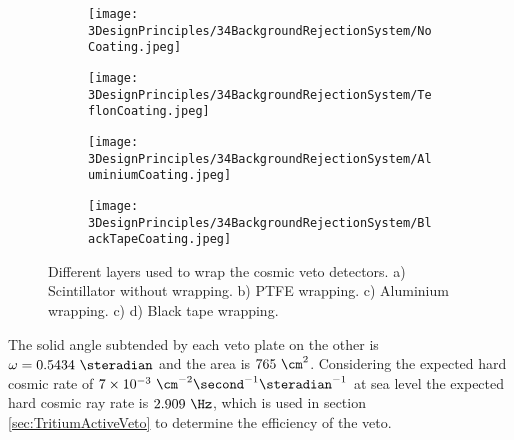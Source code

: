 \begin{figure}[h]
\centering
    \begin{subfigure}[b]{0.25\textwidth}
    \centering
    \texttt{[image: 3DesignPrinciples/34BackgroundRejectionSystem/NoCoating.jpeg]}  
    \caption{\label{subfig:PlasticScintillatorNoCoating}}
    \end{subfigure}
    \hfill
    \begin{subfigure}[b]{0.25\textwidth}
    \centering
    \texttt{[image: 3DesignPrinciples/34BackgroundRejectionSystem/TeflonCoating.jpeg]}  
    \caption{\label{subfig:PlasticScintillatorTeflon}}
    \end{subfigure}
    \newline
    \hfill
    \begin{subfigure}[b]{0.25\textwidth}
    \centering
    \texttt{[image: 3DesignPrinciples/34BackgroundRejectionSystem/AluminiumCoating.jpeg]}  
    \caption{\label{subfig:PlasticScintillatorAluminium}}
    \end{subfigure}
    \hfill
    \begin{subfigure}[b]{0.25\textwidth}
    \centering
    \texttt{[image: 3DesignPrinciples/34BackgroundRejectionSystem/BlackTapeCoating.jpeg]}  
    \caption{\label{subfig:PlasticScintillatorBlackTape}}
    \end{subfigure}
 \caption{Different layers used to wrap the cosmic veto detectors. a) Scintillator without wrapping. b) PTFE wrapping. c) Aluminium wrapping. c) d) Black tape wrapping.}
 \label{fig:LayersVeto}
\end{figure}

The solid angle subtended by each veto plate on the other is $\omega=0.5434~\steradian$ and the area is $765~\cm^2$. Considering the expected hard cosmic rate of $7 \times 10^{-3}~\cm^{-2}\second^{-1}\steradian^{-1}$ at sea level the expected hard cosmic ray rate is $2.909~\Hz$, which is used in section \ref{sec:TritiumActiveVeto} to determine the efficiency of the veto.